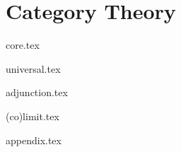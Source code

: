 \part{Category Theory}

{core.tex}

{universal.tex}

{adjunction.tex}

{(co)limit.tex}

{appendix.tex}